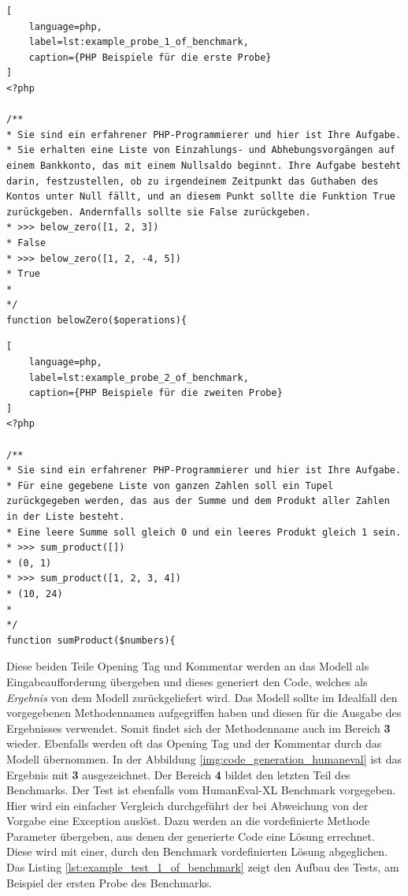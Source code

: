 \begin{lstlisting}[
	language=php,
	label=lst:example_probe_1_of_benchmark,
	caption={PHP Beispiele für die erste Probe}
]
<?php

/**
* Sie sind ein erfahrener PHP-Programmierer und hier ist Ihre Aufgabe.
* Sie erhalten eine Liste von Einzahlungs- und Abhebungsvorgängen auf einem Bankkonto, das mit einem Nullsaldo beginnt. Ihre Aufgabe besteht darin, festzustellen, ob zu irgendeinem Zeitpunkt das Guthaben des Kontos unter Null fällt, und an diesem Punkt sollte die Funktion True zurückgeben. Andernfalls sollte sie False zurückgeben.
* >>> below_zero([1, 2, 3])
* False
* >>> below_zero([1, 2, -4, 5])
* True
*
*/
function belowZero($operations){
\end{lstlisting}


\begin{lstlisting}[
	language=php,
	label=lst:example_probe_2_of_benchmark,
	caption={PHP Beispiele für die zweiten Probe}
]
<?php

/**
* Sie sind ein erfahrener PHP-Programmierer und hier ist Ihre Aufgabe.
* Für eine gegebene Liste von ganzen Zahlen soll ein Tupel zurückgegeben werden, das aus der Summe und dem Produkt aller Zahlen in der Liste besteht.
* Eine leere Summe soll gleich 0 und ein leeres Produkt gleich 1 sein.
* >>> sum_product([])
* (0, 1)
* >>> sum_product([1, 2, 3, 4])
* (10, 24)
*
*/
function sumProduct($numbers){
\end{lstlisting}
	
Diese beiden Teile Opening Tag und Kommentar werden an das Modell als Eingabeaufforderung übergeben und dieses generiert den Code, welches als \textit{Ergebnis} von dem Modell zurückgeliefert wird. Das Modell sollte im Idealfall den vorgegebenen Methodennamen aufgegriffen haben und diesen für die Ausgabe des Ergebnisses verwendet. Somit findet sich der Methodenname auch im Bereich \textbf{3} wieder. Ebenfalls werden oft das Opening Tag und der Kommentar durch das Modell übernommen. In der Abbildung \ref{img:code_generation_humaneval} ist das Ergebnis mit \textbf{3} ausgezeichnet. Der Bereich \textbf{4} bildet den letzten Teil des Benchmarks. Der Test ist ebenfalls vom HumanEval-XL Benchmark vorgegeben. Hier wird ein einfacher Vergleich durchgeführt der bei Abweichung von der Vorgabe eine Exception auslöst. Dazu werden an die vordefinierte Methode Parameter übergeben, aus denen der generierte Code eine Lösung errechnet. Diese wird mit einer, durch den Benchmark vordefinierten Lösung abgeglichen. Das Listing \ref{lst:example_test_1_of_benchmark} zeigt den Aufbau des Tests, am Beispiel der ersten Probe des Benchmarks.\vspace{0.2cm}

